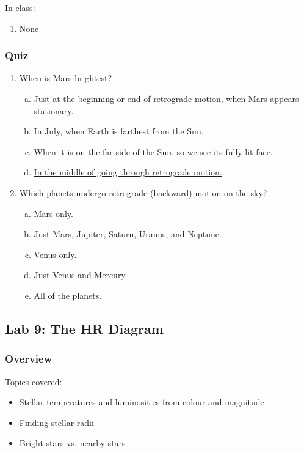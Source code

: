 \documentclass[12pt]{article}
\begin{document}
\noindent
In-class:
\begin{enumerate}
\item None
\end{enumerate}


\subsubsection{Quiz}

\begin{enumerate}
\item
When is Mars brightest?
\begin{enumerate}[a.]
    \item Just at the beginning or end of retrograde motion, when Mars appears stationary.
    \item In July, when Earth is farthest from the Sun.
    \item When it is on the far side of the Sun, so we see its fully-lit face.
    \item \underline{In the middle of going through retrograde motion.}
\end{enumerate}
\item
Which planets undergo retrograde (backward) motion on the sky?
\begin{enumerate}[a.]
    \item Mars only.
    \item Just Mars, Jupiter, Saturn, Uranus, and Neptune.
    \item Venus only.
    \item Just Venus and Mercury.
    \item \underline{All of the planets.}
\end{enumerate}
\end{enumerate}


\newpage
\subsection{Lab 9: The HR Diagram}

\subsubsection{Overview}

Topics covered:
\begin{itemize}
\item Stellar temperatures and luminosities from colour and magnitude
\item Finding stellar radii
\item Bright stars vs. nearby stars
\end{itemize}
\end{document}
